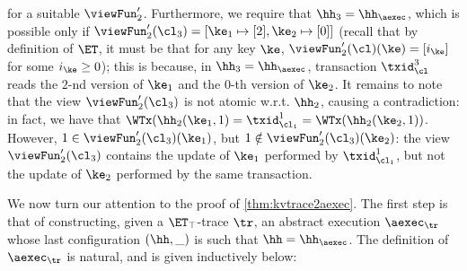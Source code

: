 \begin{example}
for a suitable $\viewFun_2'$.
Furthermore, we require that $\hh_3 = \hh_{\aexec}$, which is possible only if $\viewFun_2'(\cl_3) = [\ke_1 \mapsto [2], \ke_2 \mapsto [0] ]$ 
(recall that by definition of $\ET$, it must be that for any key $\ke$, $\viewFun_2'(\cl)(\ke) = [i_{\ke}]$ for some $i_{\ke} \geq 0$); 
this is because, in $\hh_3 = \hh_{\aexec}$, transaction $\txid_{\cl}^3$ reads the $2$-nd version of $\ke_1$ and the $0$-th version of 
$\ke_2$. It remains to note that the view $\viewFun_{2}'(\cl_3)$ is not atomic w.r.t. $\hh_2$, causing a contradiction: 
in fact, we have that $\WTx(\hh_{2}(\ke_1, 1) = \txid_{\cl_1}^{1} = \WTx(\hh_2(\ke_2, 1))$. However, 
$1 \in \viewFun_{2}'(\cl_3)(\ke_1)$, but $1 \notin \viewFun_{2}'(\cl_3)(\ke_2)$: the view $\viewFun_{2}'(\cl_3)$ 
contains the update of $\ke_1$ performed by $\txid_{\cl_1}^{1}$, but not the update of $\ke_2$ performed by the 
same transaction.
\end{example}

We now turn our attention to the proof of \cref{thm:kvtrace2aexec}. 
The first step is that of constructing, given a $\ET_{\top}$-trace $\tr$, 
an abstract execution $\aexec_{\tr}$ whose last configuration $(\hh, \_)$ 
is such that $\hh = \hh_{\aexec}$. 
The definition of $\aexec_{\tr}$ is natural, and is given inductively below: 

